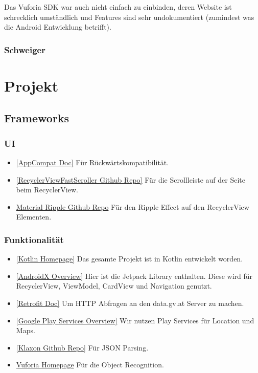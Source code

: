 \documentclass{mrtrash}
\begin{document}
Das Vuforia SDK war auch nicht einfach zu einbinden, deren Website ist schrecklich umständlich und Features sind sehr undokumentiert (zumindest was die Android Entwicklung betrifft).

\subsection{Schweiger}

\lorem \lorem \lorem

\chapter{Projekt}

\section{Frameworks}

\subsection{UI}
\begin{itemize}
    \item \href{https://developer.android.com/jetpack/androidx/releases/appcompat}{[AppCompat Doc]} Für Rückwärtskompatibilität.
    \item \href{https://github.com/danoz73/RecyclerViewFastScroller}{[RecyclerViewFastScroller Github Repo]} Für die Scrollleiste auf der Seite beim RecyclerView.
    \item \href{https://github.com/balysv/material-ripple}{Material Ripple Github Repo} Für den Ripple Effect auf den RecyclerView Elementen.
\end{itemize}

\subsection{Funktionalität}

\begin{itemize}
    \item \href{https://kotlinlang.org/}{[Kotlin Homepage]} Das gesamte Projekt ist in Kotlin entwickelt worden.
    \item \href{https://developer.android.com/jetpack/androidx}{[AndroidX Overview]} Hier ist die Jetpack Library enthalten. Diese wird für RecyclerView, ViewModel, CardView und Navigation genutzt.
    \item \href{https://square.github.io/retrofit/}{[Retrofit Doc]} Um HTTP Abfragen an den data.gv.at Server zu machen.
    \item \href{https://developers.google.com/android/guides/overview}{[Google Play Services Overview]} Wir nutzen Play Services für Location und Maps.
    \item \href{https://github.com/cbeust/klaxon}{[Klaxon Github Repo]} Für JSON Parsing.
    \item \href{https://developer.vuforia.com/}{Vuforia Homepage} Für die Object Recognition.
\end{itemize}
\end{document}
